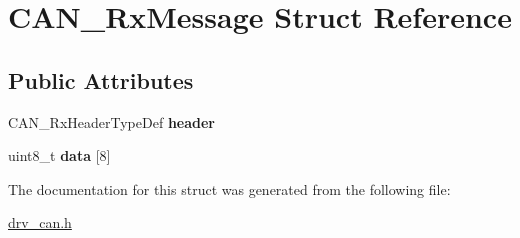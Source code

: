 \hypertarget{struct_c_a_n___rx_message}{}\section{C\+A\+N\+\_\+\+Rx\+Message Struct Reference}
\label{struct_c_a_n___rx_message}
\subsection*{Public Attributes}
\begin{DoxyCompactItemize}
\item 
\mbox{\label{struct_c_a_n___rx_message_a4a41415f33c505a2f33c840803d91e76}} 
C\+A\+N\+\_\+\+Rx\+Header\+Type\+Def {\bfseries header}
\item 
\mbox{\label{struct_c_a_n___rx_message_a1874b51844557438691b78c52e312011}} 
uint8\+\_\+t {\bfseries data} \mbox{[}8\mbox{]}
\end{DoxyCompactItemize}


The documentation for this struct was generated from the following file\+:\begin{DoxyCompactItemize}
\item 
\hyperlink{drv__can_8h}{drv\+\_\+can.\+h}\end{DoxyCompactItemize}
